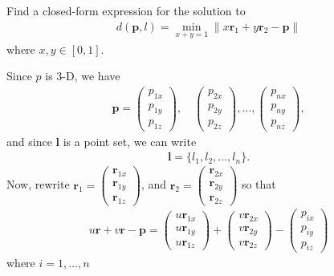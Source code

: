 \noindent 

\begin{homework}
	Find a closed-form expression for the solution to
	 \begin{align}
	d(\bm{p}, l) = \min_{x+y=1} \|x\bm{r}_1 + y \bm{r}_2 - \bm{p} \|
	\label{eq:line_seg}
	\end{align}
	where $x, y \in [0, 1 ]$.
\end{homework}

\begin{solution}
	Since $p$ is 3-D, we have
	\begin{align}
		\bm{p} = \left(
		\begin{array}{c}
		p_{1x} \\ p_{1y} \\p_{1z}
		\end{array}\right),  \quad \left(
		\begin{array}{c}
		p_{2x} \\ p_{2y} \\p_{2z}
		\end{array}\right), \ldots, 
		\left(
		\begin{array}{c}
		p_{nx} \\ p_{ny} \\p_{nz}
		\end{array}\right), 
	\end{align}
	and since $\bm{l}$ is a point set, we can write 
	\begin{align}
	 \bm{l} = \{l_1, l_2, \ldots, l_n\}.
	\end{align}
	Now, rewrite $\bm{r}_1 = \left(\begin{array}{c}
	\bm{r}_{1x} \\ \bm{r}_{1y} \\ \bm{r}_{1z}
	\end{array}\right)$, 
	and 
	$\bm{r}_2 = \left(\begin{array}{c}
	\bm{r}_{2x} \\ \bm{r}_{2y} \\ \bm{r}_{2z}
	\end{array}\right)$
	so that 
	\begin{align}
		u\bm{r} + v\bm{r} - \bm{p} = \left(\begin{array}{c}
		u\bm{r}_{1x} \\ u\bm{r}_{1y} \\ u \bm{r}_{1z}
		\end{array}\right)
		+ 
		\left(\begin{array}{c}
		v\bm{r}_{2x} \\ v\bm{r}_{2y} \\ v\bm{r}_{2z}
		\end{array}\right)
		-
		 \left(
		\begin{array}{c}
		p_{ix} \\ p_{iy} \\p_{iz}
		\end{array}\right)
	\end{align}
	where $i = 1, \ldots, n$
	

\end{solution}
